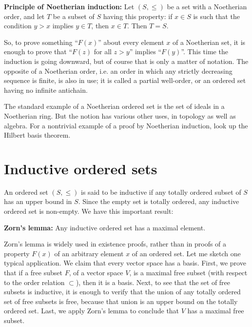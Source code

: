 \documentclass[12pt]{article}
\begin{document}
\noindent
\textbf{Principle of Noetherian induction:} Let $(S,\le)$ be
a set with a Noetherian order, and let $T$ be a subset of $S$ having
this property: if $x \in S$ is such that the condition $y>x$ implies
$y\in T$, then $x\in T$. Then $T=S$.

So, to prove something ``$F(x)$'' about every element $x$ of a Noetherian set,
it is enough to prove that ``$F(z)$ for all $z>y$'' implies ``$F(y)$''.
This time the induction is going downward, but of course that is only a
matter of notation.
The opposite of a Noetherian order, i.e. an order in which any strictly
decreasing sequence is finite, is also in use; it is called a partial
well-order, or an ordered set having no infinite antichain.

The standard example of a Noetherian ordered set is the set of ideals
in a Noetherian ring.
But the notion has various other uses, in topology
as well as algebra.
For a nontrivial example of a proof by Noetherian
induction, look up the Hilbert basis theorem.

\section{Inductive ordered sets}
An ordered set $(S,\le)$ is said to be inductive if any totally ordered subset
of $S$ has an upper bound in $S$.
Since the empty set is totally ordered,
any inductive ordered set is non-empty.
We have this important result:

\noindent
\textbf{Zorn's lemma:} Any inductive ordered set has a maximal element.

Zorn's lemma is widely used in existence proofs, rather than in proofs
of a property $F(x)$ of an arbitrary element $x$ of an ordered set.
Let me sketch one typical application.
We claim that every vector space has a basis.
First, we prove that if a free subset $F$, of a vector space $V$,
is a maximal free subset (with respect to the order relation
$\subset$), then it is a basis.
Next, to see that the set of free subsets is inductive, it is enough
to verify that the union of any totally ordered set of free subsets
is free, because that union is an upper bound on the totally ordered set.
Last, we apply Zorn's lemma to conclude that $V$ has a maximal free
subset.
\end{document}
